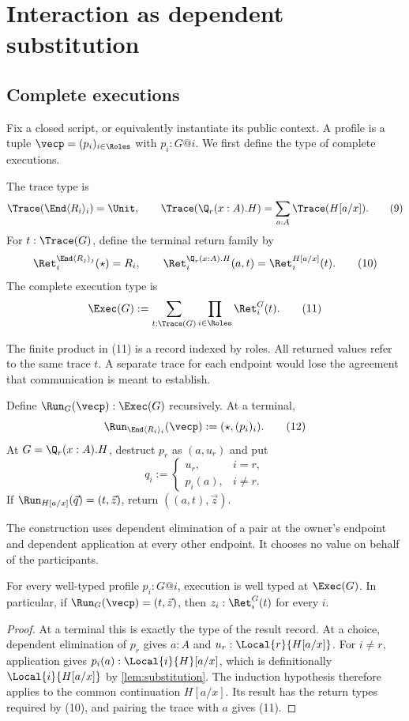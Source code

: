 \section{Interaction as dependent substitution}
\label{sec:interaction}

\subsection{Complete executions}

Fix a closed script, or equivalently instantiate its public context. A profile
is a tuple $\vecp=(p_i)_{i\in\Roles}$ with $p_i:G@i$.
We first define the type of complete executions.

\begin{definition}
The trace type is
\[
 \Trace(\End\langle R_i\rangle_i)=\Unit,
 \qquad
 \Trace(\Q_r(x:A).H)=\sum_{a:A}\Trace(H[a/x]).
 \tag{9}
\]
For $t:\Trace(G)$, define the terminal return family by
\[
 \Ret_i^{\End\langle R_j\rangle_j}(\star)=R_i,
 \qquad
 \Ret_i^{\Q_r(x:A).H}(a,t)=\Ret_i^{H[a/x]}(t).
 \tag{10}
\]
The complete execution type is
\[
 \Exec(G):=\sum_{t:\Trace(G)}\prod_{i\in\Roles}\Ret_i^G(t).
 \tag{11}
\]
\end{definition}

The finite product in (11) is a record indexed by roles. All returned values
refer to the same trace $t$. A separate trace for each endpoint would lose the
agreement that communication is meant to establish.

\begin{definition}[Execution]
\label{def:execution}
Define $\Run_G(\vecp):\Exec(G)$ recursively. At a terminal,
\[
 \Run_{\End\langle R_i\rangle_i}(\vecp)
       :=(\star,(p_i)_i).
 \tag{12}
\]
At $G=\Q_r(x:A).H$, destruct $p_r$ as $(a,u_r)$ and put
\[
 q_i:=
 \begin{cases}
   u_r,&i=r,\\
   p_i(a),&i\ne r.
 \end{cases}
 \tag{13}
\]
If $\Run_{H[a/x]}(\vec q)=(t,\vec z)$, return
$((a,t),\vec z)$.
\end{definition}

The construction uses dependent elimination of a pair at the owner's endpoint
and dependent application at every other endpoint. It chooses no value on
behalf of the participants.

\begin{lemma}
\label{thm:interaction}
For every well-typed profile $p_i:G@i$, execution is well typed at $\Exec(G)$.
In particular, if $\Run_G(\vecp)=(t,\vec z)$, then
$z_i:\Ret_i^G(t)$ for every $i$.
\end{lemma}
\begin{proof}
At a terminal this is exactly the type of the result record. At a choice,
dependent elimination of $p_r$ gives $a:A$ and $u_r:\Local{r}{H[a/x]}$.
For $i\ne r$, application gives
$p_i(a):\Local{i}{H}[a/x]$, which is definitionally
$\Local{i}{H[a/x]}$ by \cref{lem:substitution}.
The induction hypothesis therefore applies to the common continuation
$H[a/x]$. Its result has the return types required by (10), and pairing the
trace with $a$ gives (11).
\end{proof}

